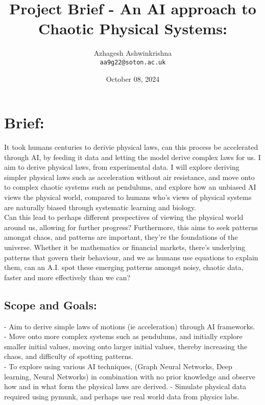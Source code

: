 \documentclass [14pt]{article}
\title{Project Brief - An AI approach to Chaotic Physical Systems:}
\author{
	Azhagesh Ashwinkrishna\\
	\texttt{aa9g22@soton.ac.uk}
}
\date{October 08, 2024}
\begin{document}
\maketitle 

\newpage 

\section{Brief: }

It took humans centuries to derivie physical laws, can this process be accelerated through AI, by feeding it data and letting the model derive complex laws for us. I aim to derive physical laws, from experimental data. I will explore deriving simpler physical laws such as acceleration without air resistance, and move onto to complex chaotic systems such as pendulums, and explore how an unbiased AI views the physical world, compared to humans who's views of physical systems are naturally biased through systematic learning and biology.\\ 

Can this lead to perhaps different prespectives of viewing the physical world around us, allowing for further progress? Furthermore, this aims to seek patterns amongat chaos, and patterns are important, they're the foundations of the universe. Whether it be mathematics or financial markets, there's underlying patterns that govern their behaviour, and we as humans use equations to explain them, can an A.I. spot these emerging patterns amongst noisy, chaotic data, faster and more effectively than we can? \\


\subsection{Scope and Goals: }

 - Aim to derive simple laws of motions (ie acceleration) through AI frameworks.\\ 

- Move onto more complex systems such as pendulums, and initially explore smaller initial values, moving onto larger initial values, 
thereby increasing the chaos, and difficulty of spotting patterns. \\

- To explore using various AI techniques, (Graph Neural Networks, Deep learning, Neural Networks) in combination with no prior knowledge and observe how and in what form the physical laws are derived.  
- Simulate physical data required using pymunk, and perhaps use real world data from physics labs.\\ 
\end{document}
